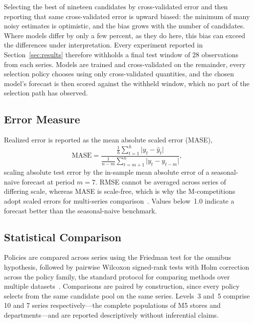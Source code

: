 Selecting the best of nineteen candidates by cross-validated error and then reporting that same cross-validated error is upward biased: the minimum of many noisy estimates is optimistic, and the bias grows with the number of candidates. Where models differ by only a few percent, as they do here, this bias can exceed the differences under interpretation. Every experiment reported in Section~\ref{sec:results} therefore withholds a final test window of 28 observations from each series. Models are trained and cross-validated on the remainder, every selection policy chooses using only cross-validated quantities, and the chosen model's forecast is then scored against the withheld window, which no part of the selection path has observed.

\subsection{Error Measure}
Realized error is reported as the mean absolute scaled error (MASE),
\begin{equation}
\mathrm{MASE} = \frac{\frac{1}{h}\sum_{t=1}^{h}\lvert y_t - \hat{y}_t \rvert}
{\frac{1}{n-m}\sum_{t=m+1}^{n}\lvert y_t - y_{t-m} \rvert},
\label{eq:mase}
\end{equation}
scaling absolute test error by the in-sample mean absolute error of a seasonal-naive forecast at period $m=7$. RMSE cannot be averaged across series of differing scale, whereas MASE is scale-free, which is why the M-competitions adopt scaled errors for multi-series comparison~\cite{makridakis2020m4}. Values below~1.0 indicate a forecast better than the seasonal-naive benchmark.

\subsection{Statistical Comparison}
Policies are compared across series using the Friedman test for the omnibus hypothesis, followed by pairwise Wilcoxon signed-rank tests with Holm correction across the policy family, the standard protocol for comparing methods over multiple datasets~\cite{demsar2006statistical}. Comparisons are paired by construction, since every policy selects from the same candidate pool on the same series. Levels~3 and~5 comprise 10 and 7 series respectively---the complete populations of M5 stores and departments---and are reported descriptively without inferential claims.

